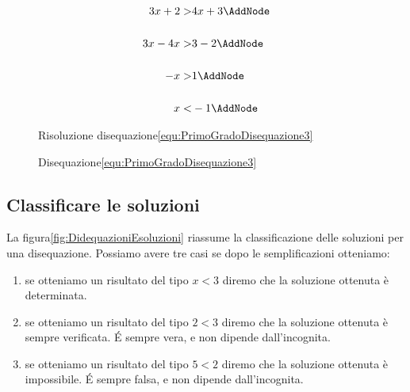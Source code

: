 \begin{figure}
	\begin{NodesList}
		\centering
		\begin{align*}
			3x+2>&4x+3\AddNode\\[.5cm]
			3x-4x>&3-2\AddNode\\[.5cm]
			-x>&1\AddNode\\[.5cm]
			x<&-1\AddNode
		\end{align*}
				\end{NodesList}
	\captionsetup{format=esempio,list=no}
	\caption{Risoluzione disequazione\nobs\vref{equ:PrimoGradoDisequazione3}}
	\label{fig:esempioDisequazioniPgrado3}
\end{figure}
\begin{figure}
	\centering
	\captionsetup{format=grafico,list=no}
	\caption{Disequazione\nobs\vref{equ:PrimoGradoDisequazione3}}
	\label{fig:esempioDisequazioniPgradografico3}
\end{figure}
\subsection{Classificare le soluzioni}
La figura\nobs\vref{fig:DidequazioniEsoluzioni} riassume la classificazione delle soluzioni per una disequazione. Possiamo avere tre casi se dopo le semplificazioni otteniamo:
\begin{enumerate}
	\item se otteniamo un risultato  del tipo $x<3$ diremo che la soluzione ottenuta è determinata.
	\item se otteniamo un risultato del tipo $2<3$ diremo che la soluzione ottenuta è sempre verificata. \'E sempre vera, e non dipende dall'incognita. 
	\item se otteniamo un risultato del tipo $5<2$ diremo che la soluzione ottenuta è impossibile. \'E sempre falsa, e non dipende dall'incognita.
\end{enumerate}
